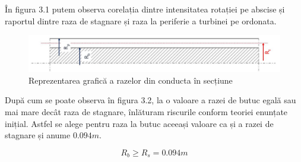 În figura 3.1 putem observa corelația dintre intensitatea rotației pe abscise și raportul dintre raza de stagnare și raza la periferie a turbinei pe ordonata.

\begin{figure}[h!]
	\centering
	\includegraphics[scale=0.5]{figures/radii.jpg}
	\caption{Reprezentarea grafică a razelor din conducta în secțiune \cite{susanhub}}
	\label{Reprezentarea grafică a razelor din conducta în secțiune}
\end{figure}

După cum se poate observa în figura 3.2, la o valoare a razei de butuc egală sau mai mare decât raza de stagnare, înlăturam riscurile conform teoriei enunțate inițial. Astfel se alege pentru raza la butuc aceeași valoare ca și a razei de stagnare și anume $0.094\si{m}$.

\begin{equation}
R_b \geq R_s = 0.094\si{m}
\end{equation}

\clearpage